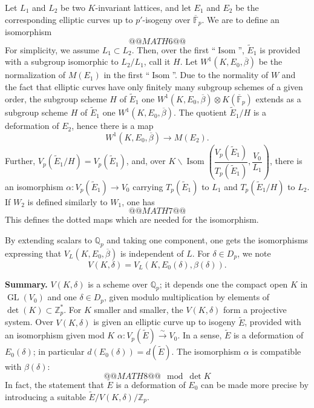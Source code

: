 \documentclass[11pt,a4paper]{article}
\theoremstyle{plain}
\theoremstyle{definition}
\theoremstyle{remark}
\DeclareMathOperator{\Isom}{Isom}
\DeclareMathOperator{\GL}{GL}
\newcommand{\Z}{\mathbb{Z}}
\newcommand{\Fpbar}{\overline{\mathbb{F}}_{p}}
\newcommand{\Zp}{\mathbb{Z}_{p}}
\newcommand{\Qp}{\mathbb{Q}_{p}}
\newcommand{\Vp}{V_{p}}
\newcommand{\Tp}{T_{p}}
\begin{document}
Let $L_{1}$ and $L_{2}$ be two $K$-invariant lattices, and let $E_{1}$ and $E_{2}$ be the corresponding elliptic curves up to $p'$-isogeny over $\Fpbar$. We are to define an isomorphism
\[
@@MATH6@@
\]
For simplicity, we assume $L_{1} \subset L_{2}$. Then, over the first ``$\Isom$'', $\widetilde{E}_{1}$ is provided with a subgroup isomorphic to $L_{2}/L_{1}$, call it $H$. Let $W^{1}(K, E_{0}, \overline{\beta})$ be the normalization of $M(E_{1})$ in the first ``$\Isom$''. Due to the normality of $W$ and the fact that elliptic curves have only finitely many subgroup schemes of a given order, the subgroup scheme $H$ of $\widetilde{E}_{1}$ one $W^{1}(K, E_{0}, \overline{\beta}) \otimes K(\Fpbar)$ extends as a subgroup scheme $H$ of $\widetilde{E}_{1}$ one $W^{1}(K, E_{0}, \overline{\beta})$. The quotient $\widetilde{E}_{1}/H$ is a deformation of $E_{2}$, hence there is a map
\[
W^{1}(K, E_{0}, \overline{\beta}) \to M(E_{2}).
\]
Further, $\Vp(\widetilde{E}_{1}/H) = \Vp(\widetilde{E}_{1})$, and, over $K \backslash \Isom\!\left(\dfrac{\Vp(\widetilde{E}_{1})}{\Tp(\widetilde{E}_{1})}, \dfrac{V_{0}}{L_{1}}\right)$, there is an isomorphism $\alpha : \Vp(\widetilde{E}_{1}) \to V_{0}$ carrying $\Tp(\widetilde{E}_{1})$ to $L_{1}$ and $\Tp(\widetilde{E}_{1}/H)$ to $L_{2}$. If $W_{2}$ is defined similarly to $W_{1}$, one has
\[
@@MATH7@@
\]
This defines the dotted maps which are needed for the isomorphism.

By extending scalars to $\Qp$ and taking one component, one gets the isomorphisms expressing that $V_{L}(K, E_{0}, \overline{\beta})$ is independent of $L$. For $\delta \in D_{p}$, we note
\[
V(K, \delta) = V_{L}(K, E_{0}(\delta), \beta(\delta)).
\]

\bigskip

\noindent
\textbf{Summary.} $V(K, \delta)$ is a scheme over $\Qp$; it depends one the compact open $K$ in $\GL(V_{0})$ and one $\delta \in D_{p}$, given modulo multiplication by elements of $\det(K) \subset \Z_{p}^{*}$. For $K$ smaller and smaller, the $V(K, \delta)$ form a projective system. Over $V(K, \delta)$ is given an elliptic curve up to isogeny $\widetilde{E}$, provided with an isomorphism given mod $K$ $\alpha : \Vp(\widetilde{E}) \xrightarrow{\sim} V_{0}$. In a sense, $\widetilde{E}$ is a deformation of $E_{0}(\delta)$; in particular $d(E_{0}(\delta)) = d(\widetilde{E})$. The isomorphism $\alpha$ is compatible with $\beta(\delta)$:
\[
@@MATH8@@
\mod \det K
\]
In fact, the statement that $\widetilde{E}$ is a deformation of $E_{0}$ can be made more precise by introducing a suitable $\widetilde{E}/V(K, \delta)/\Zp$.
\end{document}
